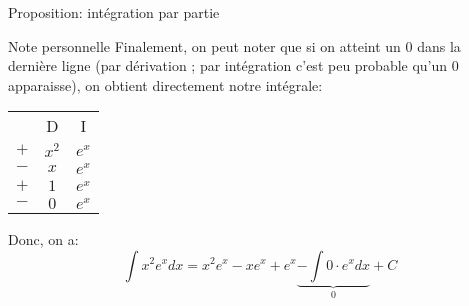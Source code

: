 \documentclass[a4paper]{article}
\begin{document}
\begin{parag}{Proposition: intégration par partie}
\begin{subparag}{Note personnelle}
        Finalement, on peut noter que si on atteint un 0 dans la dernière ligne (par dérivation ; par intégration c'est peu probable qu'un 0 apparaisse), on obtient directement notre intégrale:
        \begin{center}
        \begin{tabular}{ccc}
            & D & I  \\
            $+$ & $\displaystyle x^2$ & $\displaystyle e^x$  \\
            $-$ & $\displaystyle x$ & $\displaystyle e^x$  \\
            $+$ & $\displaystyle 1$ & $\displaystyle e^x$  \\
            $-$ & $\displaystyle 0$ & $\displaystyle e^x$
        \end{tabular}
        \end{center}

        Donc, on a:
        \[\int x^2 e^x dx = x^2 e^x - xe^x + e^x \underbrace{- \int0\cdot e^x dx}_{0} + C\]

    \end{subparag}
\end{parag}
\end{document}
